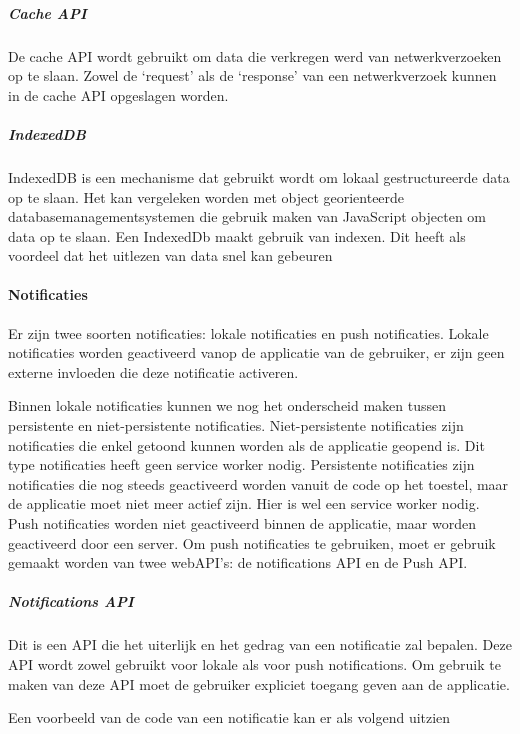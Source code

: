 			\subparagraph{Cache API}

				De cache API wordt gebruikt om data die verkregen werd van netwerkverzoeken op te slaan. Zowel de ‘request’ als de ‘response’ van een netwerkverzoek kunnen in de cache API opgeslagen worden.
				\autocite{Scales2019}

			\subparagraph{IndexedDB}

				IndexedDB is een mechanisme dat gebruikt wordt om lokaal gestructureerde data op te slaan. Het kan vergeleken worden met object georienteerde databasemanagementsystemen die gebruik maken van JavaScript objecten om data op te slaan. Een IndexedDb maakt gebruik van indexen. Dit heeft als voordeel dat het uitlezen van data snel kan gebeuren
				\autocite{Mozilla2019}
	
	
	\paragraph{Notificaties}
	
		Er zijn twee soorten notificaties: lokale notificaties en push notificaties. 
		Lokale notificaties worden geactiveerd vanop de applicatie van de gebruiker, er zijn geen externe invloeden die deze notificatie activeren.
		
		Binnen lokale notificaties kunnen we nog het onderscheid maken tussen persistente en niet-persistente notificaties.
		Niet-persistente notificaties zijn notificaties die enkel getoond kunnen worden als de applicatie geopend is. Dit type notificaties heeft geen service worker nodig. 
		Persistente notificaties zijn notificaties die nog steeds geactiveerd worden vanuit de code op het toestel, maar de applicatie moet niet meer actief zijn. Hier is wel een service worker nodig.
		{\tiny }
		Push notificaties worden niet geactiveerd binnen de applicatie, maar worden geactiveerd door een server.
		Om push notificaties te gebruiken, moet er gebruik gemaakt worden van twee webAPI’s: de notifications API en de Push API.
		
		\subparagraph{Notifications API}
			Dit is een API die het uiterlijk en het gedrag van een notificatie zal bepalen. Deze API wordt zowel gebruikt voor lokale als voor push notifications.
			Om gebruik te maken van deze API moet de gebruiker expliciet toegang geven aan de applicatie.
			
			Een voorbeeld van de code van een notificatie kan er als volgend uitzien
		
	
		
